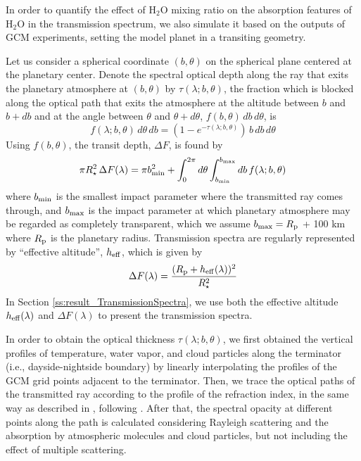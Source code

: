 \documentclass[11pt,numberedappendix,twocolappendix,]{emulateapj}
\def\water{H$_2$O }
\begin{document}
In order to quantify the effect of \water mixing ratio on the absorption features of \water in the transmission spectrum, 
we also simulate it based on the outputs of GCM experiments, setting the model planet in a transiting geometry. 


Let us consider a spherical coordinate $(b, \theta )$ on the spherical plane centered at the planetary center. 
Denote the spectral optical depth along the ray that exits the planetary atmosphere at $(b, \theta )$ by $\tau (\lambda; b, \theta )$, 
the fraction which is blocked along the optical path that exits the atmosphere at the altitude between $b$ and $b+db$ and at the angle between $\theta $ and $\theta + d\theta $, $f(b, \theta ) \, db \, d\theta$, is 
\begin{equation}
f(\lambda; b, \theta ) \, d\theta \, db = ( 1 - e^{-\tau (\lambda; b, \theta )} ) \, b \, db \, d\theta 
\end{equation}
Using $f(b, \theta )$, the transit depth, $\Delta F$, is found by
\begin{equation}
\pi R_{\star } ^2 \, \Delta F (\lambda) = \pi b_{\rm min}^2 + \int_0^{2\pi} d\theta \int_{b_{\rm min}}^{b_{\rm max}} db \, f(\lambda; b, \theta )
\end{equation}
where $b_{\rm min}$ is the smallest impact parameter where the transmitted ray comes through, and $b_{\rm max}$ is the impact parameter at which planetary atmosphere may be regarded as completely transparent, which we assume $b_{\rm max} = R_{\rm p}$ + 100 km where $R_{\rm p}$ is the planetary radius. 
Transmission spectra are regularly represented by ``effective altitude'', $h_{\rm eff}$, which is given by
\begin{equation}
\Delta F(\lambda) = \frac{( R_{\rm p} + h_{\rm eff}(\lambda)  )^2}{R_{\star }^2}
\end{equation}
In Section \ref{ss:result_TransmissionSpectra}, we use both the effective altitude $h_{\rm eff}  (\lambda)$ and $\Delta F (\lambda)$ to present the transmission spectra. 

In order to obtain the optical thickness $\tau (\lambda; b, \theta )$, we first  obtained the vertical profiles of temperature, water vapor, and cloud particles along the terminator (i.e., dayside-nightside boundary) by linearly interpolating the profiles of the GCM grid points adjacent to the terminator. 
Then, we trace the optical paths of the transmitted ray according to the profile of the refraction index, in the same way as described in \citet{vanderWerf2008}, following \citet{Misra2014}. 
After that, the spectral opacity at different points along the path is calculated considering Rayleigh scattering and the absorption by atmospheric molecules and cloud particles, but not including the effect of multiple scattering. 
\end{document}
